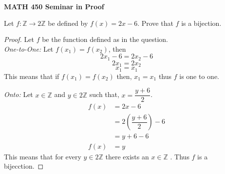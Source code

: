 \documentclass[12pt, fullpage]{article}
\newcommand{\Z}{\mathbb Z}
\begin{document}
\begin{center}
		
{\bf MATH 450 Seminar in Proof}
 \\
\end{center}
	Let $f: \Z \rightarrow 2\Z$ be defined by $f(x) = 2x - 6.$ Prove that $f$ is a bijection.
\begin{proof}
	Let $f$ be the function defined as in the question.\\
	\textit{One-to-One:} Let $f(x_1) = f(x_2)$, then \\
	\begin{equation}
	2x_1 - 6 = 2x_2 - 6
	\end{equation}
	\begin{equation}	
	2x_1 = 2x_2
	\end{equation}
	\begin{equation}
	x_1 = x_1 
	\end{equation}
	This  means that if $f(x_1) = f(x_2)$ then, $x_1 = x_1$ thus $f$ is one to one.

	\textit{Onto:} Let $x \in \Z$ and $y \in 2\Z$ such that, $x = \dfrac{y+6}{2}$. \\
	\begin{equation}			
		\begin{split}
			f(x) &= 2x - 6 \\ 
				 &= 2\left(\dfrac{y+6}{2}\right) - 6\\
				 &= y+6-6\\
			f(x) &= y			
		\end{split}
	\end{equation}
	This  means that for every $y \in 2\Z$ there exists an $x \in \Z$ .
	Thus $f$ is a bijecction.
\end{proof}
\end{document}
